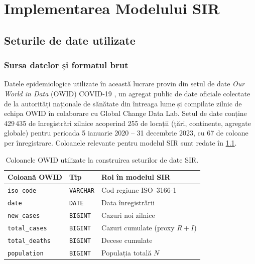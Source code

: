 
\chapter{Implementarea Modelului SIR}
\label{ch:implementare}

\section{Seturile de date utilizate}
\label{sec:seturi_date}

\subsection{Sursa datelor și formatul brut}
\label{subsec:sursa_date}

Datele epidemiologice utilizate în această lucrare provin din setul de date
\emph{Our World in Data} (OWID) COVID-19 \cite{owid_covid}, un agregat public
de date oficiale colectate de la autorități naționale de sănătate din
întreaga lume și compilate zilnic de echipa OWID în colaborare cu Global
Change Data Lab. Setul de date conține 429\,435 de înregistrări zilnice
acoperind 255 de locații (țări, continente, agregate globale) pentru
perioada 5 ianuarie 2020 -- 31 decembrie 2023, cu 67 de coloane per
înregistrare. Coloanele relevante pentru modelul SIR sunt redate în
\cref{tab:owid_cols}.

\begin{table}[htbp]
\centering
\caption{Coloanele OWID utilizate la construirea seturilor de date SIR.}
\label{tab:owid_cols}
\begin{tabular}{lll}
\toprule
\textbf{Coloană OWID} & \textbf{Tip} & \textbf{Rol în modelul SIR} \\
\midrule
\texttt{iso\_code}       & \texttt{VARCHAR} & Cod regiune ISO~3166-1 \\
\texttt{date}            & \texttt{DATE}    & Data înregistrării \\
\texttt{new\_cases}      & \texttt{BIGINT}  & Cazuri noi zilnice \\
\texttt{total\_cases}    & \texttt{BIGINT}  & Cazuri cumulate (proxy $R+I$) \\
\texttt{total\_deaths}   & \texttt{BIGINT}  & Decese cumulate \\
\texttt{population}      & \texttt{BIGINT}  & Populația totală $N$ \\
\bottomrule
\end{tabular}
\end{table}

